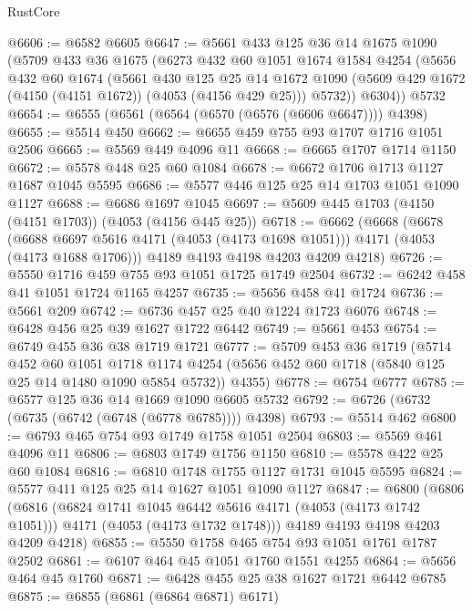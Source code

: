 \begin{lexlean}{RustCore}
\begin{coremodule}
@6606 := @6582 @6605
@6647 := @5661
    @433
    @125
    @36
    @14
    @1675
    @1090
    (@5709
      @433
      @36
      @1675
      (@6273
        @432
        @60
        @1051
        @1674
        @1584
        @4254
        (@5656
          @432
          @60
          @1674
          (@5661
            @430
            @125
            @25
            @14
            @1672
            @1090
            (@5609 @429 @1672 (@4150 (@4151 @1672)) (@4053 (@4156 @429 @25)))
            @5732))
        @6304))
    @5732
@6654 := @6555 (@6561 (@6564 (@6570 (@6576 (@6606 @6647)))) @4398)
@6655 := @5514 @450
@6662 := @6655 @459 @755 @93 @1707 @1716 @1051 @2506
@6665 := @5569 @449 @4096 @11
@6668 := @6665 @1707 @1714 @1150
@6672 := @5578 @448 @25 @60 @1084
@6678 := @6672 @1706 @1713 @1127 @1687 @1045 @5595
@6686 := @5577 @446 @125 @25 @14 @1703 @1051 @1090 @1127
@6688 := @6686 @1697 @1045
@6697 := @5609 @445 @1703 (@4150 (@4151 @1703)) (@4053 (@4156 @445 @25))
@6718 := @6662
    (@6668
      (@6678
        (@6688 @6697 @5616 @4171 (@4053 (@4173 @1698 @1051)))
        @4171
        (@4053 (@4173 @1688 @1706)))
      @4189
      @4193
      @4198
      @4203
      @4209
      @4218)
@6726 := @5550 @1716 @459 @755 @93 @1051 @1725 @1749 @2504
@6732 := @6242 @458 @41 @1051 @1724 @1165 @4257
@6735 := @5656 @458 @41 @1724
@6736 := @5661 @209
@6742 := @6736 @457 @25 @40 @1224 @1723 @6076
@6748 := @6428 @456 @25 @39 @1627 @1722 @6442
@6749 := @5661 @453
@6754 := @6749 @455 @36 @38 @1719 @1721
@6777 := @5709
    @453
    @36
    @1719
    (@5714
      @452
      @60
      @1051
      @1718
      @1174
      @4254
      (@5656 @452 @60 @1718 (@5840 @125 @25 @14 @1480 @1090 @5854 @5732))
      @4355)
@6778 := @6754 @6777
@6785 := @6577 @125 @36 @14 @1669 @1090 @6605 @5732
@6792 := @6726 (@6732 (@6735 (@6742 (@6748 (@6778 @6785)))) @4398)
@6793 := @5514 @462
@6800 := @6793 @465 @754 @93 @1749 @1758 @1051 @2504
@6803 := @5569 @461 @4096 @11
@6806 := @6803 @1749 @1756 @1150
@6810 := @5578 @422 @25 @60 @1084
@6816 := @6810 @1748 @1755 @1127 @1731 @1045 @5595
@6824 := @5577 @411 @125 @25 @14 @1627 @1051 @1090 @1127
@6847 := @6800
    (@6806
      (@6816
        (@6824 @1741 @1045 @6442 @5616 @4171 (@4053 (@4173 @1742 @1051)))
        @4171
        (@4053 (@4173 @1732 @1748)))
      @4189
      @4193
      @4198
      @4203
      @4209
      @4218)
@6855 := @5550 @1758 @465 @754 @93 @1051 @1761 @1787 @2502
@6861 := @6107 @464 @45 @1051 @1760 @1551 @4255
@6864 := @5656 @464 @45 @1760
@6871 := @6428 @455 @25 @38 @1627 @1721 @6442 @6785
@6875 := @6855 (@6861 (@6864 @6871) @6171)

\end{coremodule}
\end{lexlean}

